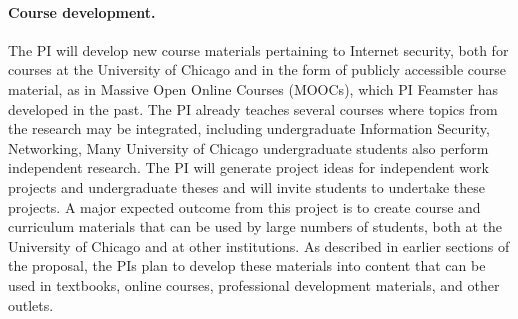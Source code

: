 \paragraph{Course development.} The PI will develop new course materials
pertaining to Internet security, both for courses at the University of Chicago
and in the form of publicly accessible course material, as in Massive Open
Online Courses (MOOCs), which PI Feamster has developed in the past. The PI
already teaches several courses where topics from the research may be
integrated, including undergraduate Information Security, Networking, Many
University of Chicago undergraduate students also perform independent
research. The PI will generate project ideas for independent work projects and
undergraduate theses and will invite students to undertake these projects. A
major expected outcome from this project is to create course and curriculum
materials that can be used by large numbers of students, both at the
University of Chicago and at other institutions. As described in earlier
sections of the proposal, the PIs plan to develop these materials into content
that can be used in textbooks, online courses, professional development
materials, and other outlets. 
